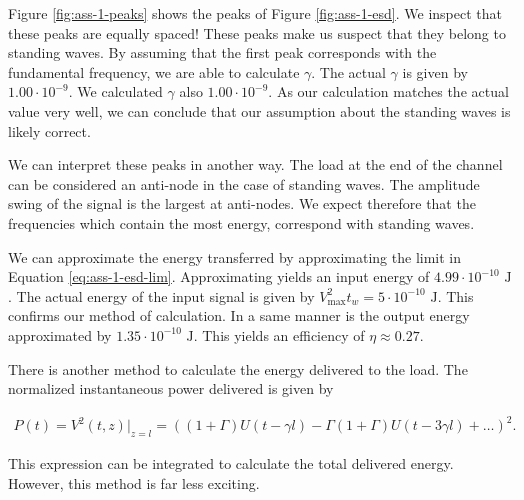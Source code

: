 \documentclass[11pt,titlepage]{report}
\begin{document}
Figure \ref{fig:ass-1-peaks} shows the peaks of Figure \ref{fig:ass-1-esd}. We inspect that these peaks are equally spaced! These peaks make us suspect that they belong to standing waves. By assuming that the first peak corresponds with the fundamental frequency, we are able to calculate $\gamma$. The actual $\gamma$ is given by $1.00 \cdot 10^{-9}$. We calculated $\gamma$ also $1.00 \cdot 10^{-9}$. As our calculation matches the actual value very well, we can conclude that our assumption about the standing waves is likely correct.

We can interpret these peaks in another way. The load at the end of the channel can be considered an anti-node in the case of standing waves. The amplitude swing of the signal is the largest at anti-nodes. We expect therefore that the frequencies which contain the most energy, correspond with standing waves.

We can approximate the energy transferred by approximating the limit in Equation \ref{eq:ass-1-esd-lim}. Approximating yields an input energy of $4.99 \cdot 10^{-10} \text{ J}$. The actual energy of the input signal is given by $V_{\text{max}}^2 t_w =5 \cdot 10^{-10} \text{ J}$. This confirms our method of calculation. In a same manner is the output energy approximated by $1.35 \cdot 10^{-10} \text{ J}$. This yields an efficiency of $\eta\approx0.27$.

There is another method to calculate the energy delivered to the load. The normalized instantaneous power delivered is given by

\begin{align}
	P(t)=V^2(t,z)|_{z=l}=\left((1+\Gamma)U(t- \gamma l) - \Gamma (1+ \Gamma) U(t - 3 \gamma  l) + \dots\right)^2.
\end{align}

This expression can be integrated to calculate the total delivered energy. However, this method is far less exciting.
\end{document}
